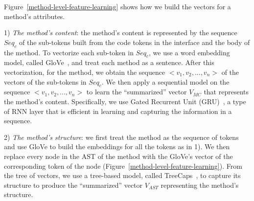 Figure~\ref{method-level-feature-learning} shows how we build the
vectors for a method's attributes.


1) {\em The method's content}: the method's content is represented by
the sequence $Seq_c$ of the sub-tokens built from the code tokens in
the interface and the body of the method. To vectorize each sub-token
in $Seq_c$, we use a word embedding model, called
GloVe~\cite{glove2014}, and treat each method as a sentence.
After this vectorization, for the method, we obtain the sequence
$<$$v_1, v_2, ..., v_n$$>$ of the vectors of the sub-tokens in
$Seq_c$.  We then apply a sequential model on the sequence
$<$$v_1,v_2,...,v_n$$>$ to learn the ``summarized'' vector $V_{MC}$
that represents the method's content. Specifically, we use Gated
Recurrent Unit (GRU)~\cite{cho2014learning}, a type of RNN layer that
is efficient in learning and capturing the information in a
sequence.


2) {\em The method's structure}: we first treat the
method as the sequence of tokens and use GloVe to build
the embeddings for all the tokens as in 1). We then replace every node
in the AST of the method with the GloVe's vector of the corresponding
token of the node (Figure~\ref{method-level-feature-learning}).  From
the tree of vectors, we use a tree-based model, called
TreeCaps~\cite{bui2021treecaps}, to capture its structure to
produce the ``summarized'' vector $V_{AST}$ representing the
method's structure.

